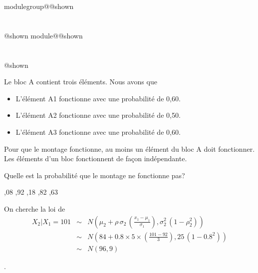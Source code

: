 \documentclass{Evaluation}
\makeatletter
\newcommand{\currentmodulekey}{}
\newcommand{\currentmoduletitle}{}
\newcommand{\currentgroupkey}{}
\newcommand{\currentgrouptitle}{}
\newcommand{\showmoduleifneeded}{%
  \ifx\currentgroupkey\empty\else
    \expandafter\ifx\csname modulegroup@\currentgroupkey @shown\endcsname\relax
      \section*{\currentgrouptitle}%
      \expandafter\gdef\csname modulegroup@\currentgroupkey @shown\endcsname{1}%
    \fi
  \fi
  \expandafter\ifx\csname module@\currentmodulekey @shown\endcsname\relax
    \section*{\currentmoduletitle}%
    \expandafter\gdef\csname module@\currentmodulekey @shown\endcsname{1}%
  \fi
}
\newenvironment{A23}{\showmoduleifneeded}{}
\makeatother
\begin{document}
\begin{questions}
\begin{A23}
\begin{figure}[h!]
\begin{center}
 \end{center}
\end{figure}
	
 Le bloc A contient trois éléments. Nous avons que
\begin{itemize}
    \item L'élément A1 fonctionne avec une probabilité de 0,60.
    \item L'élément A2 fonctionne avec une probabilité de 0,50.
    \item L'élément A3 fonctionne avec une probabilité de 0,60.
\end{itemize}
Pour que le montage fonctionne, au moins un élément du bloc A doit fonctionner. Les éléments d'un bloc fonctionnent de façon indépendante.
	

 Quelle est la probabilité que le montage ne fonctionne pas? 

 \begin{oneparcheckboxes}
		,08
		,92
		,18 
		,82
		,63
\end{oneparcheckboxes}

\begin{solution}
On cherche la loi de
		\begin{eqnarray*}
			{X}_2|{X}_1=101 &\sim& N\left(\mu_2 +\rho\, \sigma_2\, \left(\frac{x_1-\mu_1}{\sigma_1}\right),\sigma_2^2 \,\left(1-\rho_2^2\right)\right)\\
			&\sim& N\left(84 +0.8\times 5\times \left(\frac{101-92}{3}\right),25 \,\left(1-0.8^2\right)\right)\\
			&\sim& N\left(96, 9 \right)
	\end{eqnarray*}
\end{solution}

.
\end{A23}


\end{questions}
\end{document}
